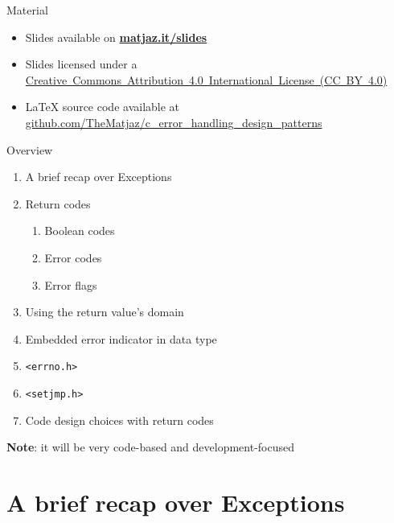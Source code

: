 \documentclass[aspectratio=169,14pt]{beamer}
\date{2019-01-09}
\begin{document}
\begin{frame}
\titlepage
\end{frame}



\begin{frame}[label=material]{Material}
\begin{itemize}
    \item Slides available on \href{https://matjaz.it/slides/}{\textbf{matjaz.it/slides}} 
    \item Slides licensed under a 
    \href{https://creativecommons.org/licenses/by/4.0/}{Creative~Commons~Attribution~4.0~International~License~(CC~BY~4.0)}
    \item LaTeX source code available at
    \href{https://github.com/TheMatjaz/c_error_handling_design_patterns}{github.com/TheMatjaz/c\_error\_handling\_design\_patterns}
\end{itemize}
\end{frame}



\begin{frame}{Overview}
\begin{enumerate}
    \item A brief recap over Exceptions
    \item Return codes\\
    \begin{enumerate}
        \item Boolean codes
        \item Error codes
        \item Error flags
    \end{enumerate}
    \item Using the return value's domain
    \item Embedded error indicator in data type
    \item \texttt{<errno.h>}
    \item \texttt{<setjmp.h>}
    \item Code design choices with return codes
\end{enumerate}

\textbf{Note}: it will be very code-based and development-focused
\end{frame}





\section{A brief recap over Exceptions}
\end{document}
